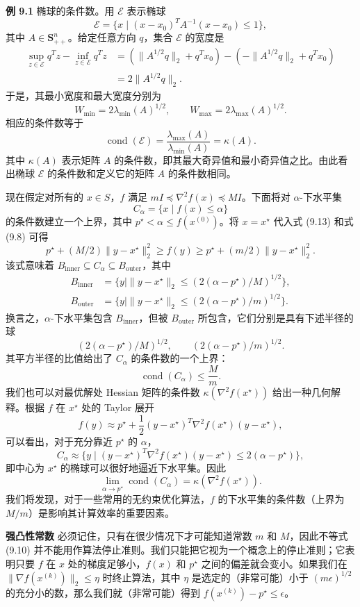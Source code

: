 \documentclass[UTF8, 12pt, fontset=fandol, oneside]{ctexart}
\begin{document}
\noindent\textbf{例 9.1}\quad
椭球的条件数。用 $\mathcal{E}$ 表示椭球
\[
\mathcal{E}=\{x\mid (x-x_0)^TA^{-1}(x-x_0)\leq1\},
\]
其中 $A\in\mathbf{S}_{++}^n$。给定任意方向 $q$，集合 $\mathcal{E}$ 的宽度是
\[
\begin{aligned}
\sup_{z\in\mathcal{E}}q^Tz-\inf_{z\in\mathcal{E}}q^Tz
&=(\|A^{1/2}q\|_2+q^Tx_0)-(-\|A^{1/2}q\|_2+q^Tx_0)\\
&=2\|A^{1/2}q\|_2.
\end{aligned}
\]
于是，其最小宽度和最大宽度分别为
\[
W_{\min}=2\lambda_{\min}(A)^{1/2},\qquad
W_{\max}=2\lambda_{\max}(A)^{1/2}.
\]
相应的条件数等于
\[
\operatorname{cond}(\mathcal{E})=\frac{\lambda_{\max}(A)}{\lambda_{\min}(A)}=\kappa(A).
\]
其中 $\kappa(A)$ 表示矩阵 $A$ 的条件数，即其最大奇异值和最小奇异值之比。由此看出椭球 $\mathcal{E}$ 的条件数和定义它的矩阵 $A$ 的条件数相同。

现在假定对所有的 $x\in S$，$f$ 满足 $mI\preceq\nabla^2 f(x)\preceq MI$。下面将对 $\alpha$-下水平集
\[
C_\alpha=\{x\mid f(x)\leq\alpha\}
\]
的条件数建立一个上界，其中 $p^\star<\alpha\leq f(x^{(0)})$。将 $x=x^\star$ 代入式 (9.13) 和式 (9.8) 可得
\[
p^\star+(M/2)\|y-x^\star\|_2^2\geq f(y)\geq p^\star+(m/2)\|y-x^\star\|_2^2.
\]
该式意味着 $B_{\mathrm{inner}}\subseteq C_\alpha\subseteq B_{\mathrm{outer}}$，其中
\[
\begin{aligned}
B_{\mathrm{inner}}&=\{y\mid \|y-x^\star\|_2\leq (2(\alpha-p^\star)/M)^{1/2}\},\\
B_{\mathrm{outer}}&=\{y\mid \|y-x^\star\|_2\leq (2(\alpha-p^\star)/m)^{1/2}\}.
\end{aligned}
\]
换言之，$\alpha$-下水平集包含 $B_{\mathrm{inner}}$，但被 $B_{\mathrm{outer}}$ 所包含，它们分别是具有下述半径的球
\[
(2(\alpha-p^\star)/M)^{1/2},\qquad (2(\alpha-p^\star)/m)^{1/2}.
\]
其平方半径的比值给出了 $C_\alpha$ 的条件数的一个上界：
\[
\operatorname{cond}(C_\alpha)\leq\frac{M}{m}.
\]
我们也可以对最优解处 Hessian 矩阵的条件数 $\kappa(\nabla^2 f(x^\star))$ 给出一种几何解释。根据 $f$ 在 $x^\star$ 处的 Taylor 展开
\[
f(y)\approx p^\star+\frac{1}{2}(y-x^\star)^T\nabla^2 f(x^\star)(y-x^\star),
\]
可以看出，对于充分靠近 $p^\star$ 的 $\alpha$，
\[
C_\alpha\approx \{y\mid (y-x^\star)^T\nabla^2 f(x^\star)(y-x^\star)\leq 2(\alpha-p^\star)\},
\]
即中心为 $x^\star$ 的椭球可以很好地逼近下水平集。因此
\[
\lim_{\alpha\to p^\star}\operatorname{cond}(C_\alpha)=\kappa(\nabla^2 f(x^\star)).
\]
我们将发现，对于一些常用的无约束优化算法，$f$ 的下水平集的条件数（上界为 $M/m$）是影响其计算效率的重要因素。

\noindent\textbf{强凸性常数}\quad
必须记住，只有在很少情况下才可能知道常数 $m$ 和 $M$，因此不等式 (9.10) 并不能用作算法停止准则。我们只能把它视为一个概念上的停止准则；它表明只要 $f$ 在 $x$ 处的梯度足够小，$f(x)$ 和 $p^\star$ 之间的偏差就会变小。如果我们在 $\|\nabla f(x^{(k)})\|_2\leq\eta$ 时终止算法，其中 $\eta$ 是选定的（非常可能）小于 $(m\epsilon)^{1/2}$ 的充分小的数，那么我们就（非常可能）得到 $f(x^{(k)})-p^\star\leq\epsilon$。
\end{document}
